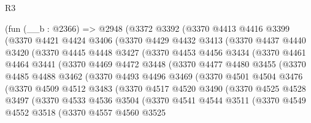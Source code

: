 \begin{lexlean}{R3}
\begin{coremodule}
    (fun (__b : @2366) =>
    @2948
      (@3372
        @3392
        (@3370
          @4413
          @4416
          @3399
          (@3370
            @4421
            @4424
            @3406
            (@3370
              @4429
              @4432
              @3413
              (@3370
                @4437
                @4440
                @3420
                (@3370
                  @4445
                  @4448
                  @3427
                  (@3370
                    @4453
                    @4456
                    @3434
                    (@3370
                      @4461
                      @4464
                      @3441
                      (@3370
                        @4469
                        @4472
                        @3448
                        (@3370
                          @4477
                          @4480
                          @3455
                          (@3370
                            @4485
                            @4488
                            @3462
                            (@3370
                              @4493
                              @4496
                              @3469
                              (@3370
                                @4501
                                @4504
                                @3476
                                (@3370
                                  @4509
                                  @4512
                                  @3483
                                  (@3370
                                    @4517
                                    @4520
                                    @3490
                                    (@3370
                                      @4525
                                      @4528
                                      @3497
                                      (@3370
                                        @4533
                                        @4536
                                        @3504
                                        (@3370
                                          @4541
                                          @4544
                                          @3511
                                          (@3370
                                            @4549
                                            @4552
                                            @3518
                                            (@3370
                                              @4557
                                              @4560
                                              @3525

\end{coremodule}
\end{lexlean}
